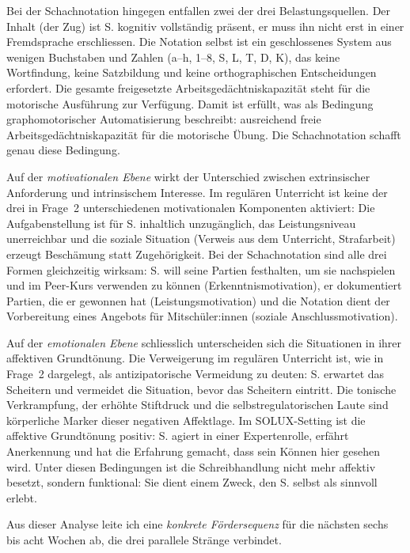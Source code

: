 \documentclass[ngerman, a4paper]{article}
\begin{document}
Bei der Schachnotation hingegen entfallen zwei der drei Belastungsquellen. Der
Inhalt (der Zug) ist S. kognitiv vollständig präsent, er muss ihn nicht erst
in einer Fremdsprache erschliessen. Die Notation selbst ist ein geschlossenes
System aus wenigen Buchstaben und Zahlen (a--h, 1--8, S, L, T, D, K), das keine
Wortfindung, keine Satzbildung und keine orthographischen Entscheidungen
erfordert. Die gesamte freigesetzte Arbeitsgedächtniskapazität steht für die
motorische Ausführung zur Verfügung. Damit ist erfüllt, was
\textcite[S.\,130]{nottbusch2017graphomotorik} als Bedingung graphomotorischer
Automatisierung beschreibt: ausreichend freie Arbeitsgedächtniskapazität für
die motorische Übung. Die Schachnotation schafft genau diese Bedingung.

Auf der \textit{motivationalen Ebene} wirkt der Unterschied zwischen extrinsischer
Anforderung und intrinsischem Interesse. Im regulären Unterricht ist
keine der drei in Frage~2 unterschiedenen motivationalen Komponenten
aktiviert: Die Aufgabenstellung ist für S. inhaltlich
unzugänglich, das Leistungsniveau unerreichbar und die soziale Situation (Verweis
aus dem Unterricht, Strafarbeit) erzeugt Beschämung statt Zugehörigkeit. Bei der
Schachnotation sind alle drei Formen gleichzeitig wirksam: S. will seine Partien
festhalten, um sie nachspielen und im Peer-Kurs verwenden zu können
(Erkenntnismotivation), er dokumentiert Partien, die er gewonnen hat
(Leistungsmotivation) und die Notation dient der Vorbereitung eines Angebots
für Mitschüler:innen (soziale Anschlussmotivation).

Auf der \textit{emotionalen Ebene} schliesslich unterscheiden sich die Situationen
in ihrer affektiven Grundtönung. Die Verweigerung im regulären Unterricht ist,
wie in Frage~2 dargelegt, als antizipatorische Vermeidung zu deuten: S. erwartet
das Scheitern und vermeidet die Situation, bevor das Scheitern eintritt. Die
tonische Verkrampfung, der erhöhte Stiftdruck und die selbstregulatorischen Laute
sind körperliche Marker dieser negativen Affektlage. Im SOLUX-Setting ist die
affektive Grundtönung positiv: S. agiert in einer Expertenrolle, erfährt
Anerkennung und hat die Erfahrung gemacht, dass sein Können hier gesehen wird.
Unter diesen Bedingungen ist die Schreibhandlung nicht mehr affektiv besetzt,
sondern funktional: Sie dient einem Zweck, den S. selbst als sinnvoll erlebt.

Aus dieser Analyse leite ich eine \textit{konkrete Fördersequenz} für die nächsten
sechs bis acht Wochen ab, die drei parallele Stränge verbindet.
\end{document}
